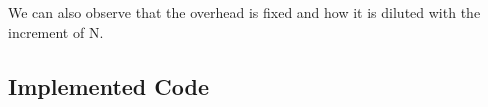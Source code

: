 \documentclass{article}
\begin{document}
We can also observe that the overhead is fixed and how it is diluted with the increment of N.




\begin{appendices}
\appendix
\appendixpage
\section{Implemented Code} \label{ape:fullCode}

\end{appendices}
\end{document}
